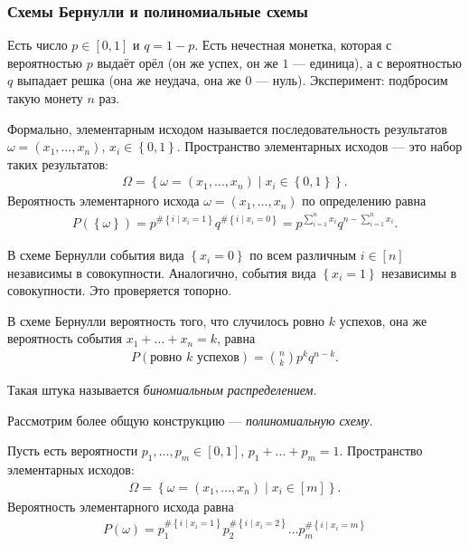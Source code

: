
\subsubsection*{Схемы Бернулли и полиномиальные схемы}

\begin{df*}
 Есть число $p \in [0,1]$ и $q = 1 - p$. Есть нечестная монетка, которая с вероятностью $p$ выдаёт орёл (он же успех, он же $1$ --- единица), а с вероятностью $q$ выпадает решка (она же неудача, она же $0$ --- нуль). Эксперимент: подбросим такую монету $n$ раз.

 Формально, элементарным исходом называется последовательность результатов $\omega = (x_1, \ldots, x_n)$, $x_i \in \left\{ 0,1 \right\}$. Пространство элементарных исходов --- это набор таких результатов:
 \begin{align*}
  \Omega = \left\{ \omega = (x_1, \ldots, x_n) \mid x_i \in \left\{ 0,1 \right\} \right\}.
 \end{align*} Вероятность элементарного исхода $\omega = (x_1, \ldots, x_n)$ по определению равна
 \begin{align*}
  P(\left\{ \omega \right\}) = p^{\# \left\{ i \mid x_i = 1 \right\}} q^{\# \left\{ i \mid x_i = 0 \right\}} = p^{\sum_{i=1}^{n} x_i} q^{n - \sum_{i=1}^{n} x_i}
 .\end{align*} 
\end{df*}

\begin{prop*}
 В схеме Бернулли события вида $\left\{ x_i = 0 \right\}$ по всем различным $i \in [n]$ независимы в совокупности. Аналогично, события вида $\left\{ x_i = 1 \right\}$  независимы в совокупности. Это проверяется топорно.
\end{prop*}

\begin{prop*}
 В схеме Бернулли вероятность того, что случилось ровно $k$ успехов, она же вероятность события $x_1 + \ldots + x_n = k$, равна
 \begin{align*}
  P(\text{ровно $k$ успехов}) = \binom n k p^{k} q^{n-k}
 .\end{align*} 
\end{prop*}
Такая штука называется \textit{биномиальным распределением}.

Рассмотрим более общую конструкцию --- \textit{полиномиальную схему}.
\begin{df*}
 Пусть есть вероятности $p_1, \ldots, p_m \in [0,1]$, $p_1 + \ldots + p_m = 1$. Пространство элементарных исходов:
 \begin{align*}
  \Omega = \left\{ \omega = (x_1, \ldots, x_n) \mid x_i \in [m] \right\}.
 \end{align*} Вероятность элементарного исхода равна
 \begin{align*}
  P(\omega) = p_1^{\# \left\{ i \mid x_i = 1 \right\}} p_2^{\# \left\{ i \mid x_i = 2 \right\}} \ldots p_m^{\# \left\{ i \mid x_i = m \right\}}
 \end{align*} 
\end{df*}


